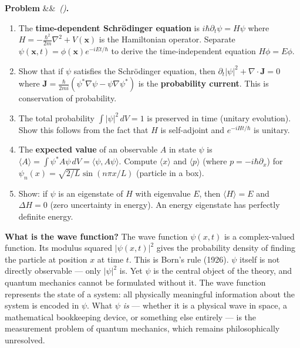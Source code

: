 \documentclass[12pt,a4paper]{article}
\newcounter{problem}
\newenvironment{problem}[1][]{\refstepcounter{problem}\par\vspace{6pt}\noindent\textbf{\color{MidBlue}Problem \theproblem}\ifx&#1&\else\ \textit{(#1)}\fi\textbf{.}\enskip}{\par\vspace{4pt}}
\begin{document}
\begin{problem}
\label{prob:schrodinger}
\begin{enumerate}[label=(\alph*),topsep=2pt]
  \item The \textbf{time-dependent Schr\"{o}dinger equation} is $i\hbar\partial_t\psi = H\psi$ where $H = -\frac{\hbar^2}{2m}\nabla^2 + V(\mathbf{x})$ is the Hamiltonian operator. Separate $\psi(\mathbf{x},t) = \phi(\mathbf{x})e^{-iEt/\hbar}$ to derive the time-independent equation $H\phi = E\phi$.
  \item Show that if $\psi$ satisfies the Schr\"{o}dinger equation, then $\partial_t|\psi|^2 + \nabla\cdot\mathbf{J} = 0$ where $\mathbf{J} = \frac{\hbar}{2mi}(\psi^*\nabla\psi - \psi\nabla\psi^*)$ is the \textbf{probability current}. This is conservation of probability.
  \item The total probability $\int|\psi|^2\,dV=1$ is preserved in time (unitary evolution). Show this follows from the fact that $H$ is self-adjoint and $e^{-iHt/\hbar}$ is unitary.
  \item The \textbf{expected value} of an observable $A$ in state $\psi$ is $\langle A\rangle = \int\psi^* A\psi\,dV = \langle\psi,A\psi\rangle$. Compute $\langle x\rangle$ and $\langle p\rangle$ (where $p=-i\hbar\partial_x$) for $\psi_n(x) = \sqrt{2/L}\sin(n\pi x/L)$ (particle in a box).
  \item Show: if $\psi$ is an eigenstate of $H$ with eigenvalue $E$, then $\langle H\rangle = E$ and $\Delta H = 0$ (zero uncertainty in energy). An energy eigenstate has perfectly definite energy.
\end{enumerate}
\end{problem}

\begin{thought}
\textbf{What is the wave function?}
The wave function $\psi(x,t)$ is a complex-valued function. Its modulus squared $|\psi(x,t)|^2$ gives the probability density of finding the particle at position $x$ at time $t$. This is Born's rule (1926). $\psi$ itself is not directly observable --- only $|\psi|^2$ is. Yet $\psi$ is the central object of the theory, and quantum mechanics cannot be formulated without it. The wave function represents the state of a system: all physically meaningful information about the system is encoded in $\psi$. What $\psi$ \emph{is} --- whether it is a physical wave in space, a mathematical bookkeeping device, or something else entirely --- is the measurement problem of quantum mechanics, which remains philosophically unresolved.
\end{thought}
\end{document}
